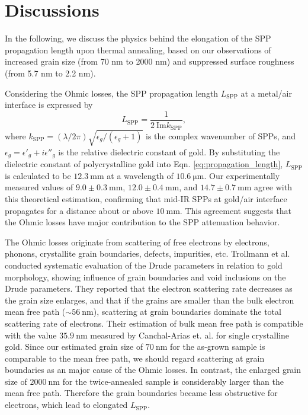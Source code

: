 \documentclass[aip,apl,reprint]{revtex4-1}
\begin{document}
\section{Discussions}
\label{sec:discussion}
In the following, we discuss the physics behind the elongation of the SPP propagation length upon thermal annealing, based on our observations of increased grain size (from 70 nm to 2000 nm) and suppressed surface roughness (from 5.7 nm to 2.2 nm). 

Considering the Ohmic losses, the SPP propagation length $L_{\mathrm{SPP}}$ at a metal/air interface is expressed by
\begin{equation}
 L_{\mathrm{SPP}} = \frac{1}{2\:\mathrm{Im} k_{\mathrm{SPP}}},
\label{eq:propagation_length}
 \end{equation}
where $k_{\mathrm{SPP}}=(\lambda/2\pi)\sqrt{\epsilon_g/(\epsilon_g+1)}$ is the complex wavenumber of SPPs, and $\epsilon_g=\epsilon'_g+i\epsilon''_g$ is the relative dielectric constant of gold. 
By substituting the dielectric constant of polycrystalline gold\cite{Palik} into Eqn. \ref{eq:propagation_length}, $L_{\mathrm{SPP}}$ is calculated to be $12.3\:\mathrm{mm}$ at a wavelength of $10.6\:\mathrm{\mu m}$.
Our experimentally measured values of $9.0\pm0.3\:\mathrm{mm}$, $12.0\pm0.4\:\mathrm{mm}$, and $14.7\pm0.7\:\mathrm{mm}$ agree with this theoretical estimation, confirming that mid-IR SPPs at gold/air interface propagates for a distance about or above $10\:\mathrm{mm}$. 
This agreement suggests that the Ohmic losses have major contribution to the SPP attenuation behavior.

The Ohmic losses originate from scattering of free electrons by electrons, phonons, crystallite grain boundaries, defects, impurities\cite{Yang}, etc. Trollmann et al.\cite{Trollmann} conducted systematic evaluation of the Drude parameters in relation to gold morphology, showing influence of grain boundaries and void inclusions on the Drude parameters. 
They reported that the electron scattering rate decreases as the grain size enlarges, and that if the grains are smaller than the bulk electron mean free path ($\sim 56\:\mathrm{nm}$), scattering at grain boundaries dominate the total scattering rate of electrons. 
Their estimation of bulk mean free path is compatible with the value $35.9 \:\mathrm{nm}$ measured by Canchal-Arias et. al.\cite{Canchal-Arias} for single crystalline gold. Since our estimated grain size of $70\:\mathrm{nm}$ for the as-grown sample is comparable to the mean free path, we should regard scattering at grain boundaries as an major cause of the Ohmic losses. In contrast, the enlarged grain size of $2000\:\mathrm{nm}$ for the twice-annealed sample is considerably larger than the mean free path. Therefore the grain boundaries became less obstructive for electrons, which lead to elongated $L_{\mathrm{SPP}}$. 
\end{document}
